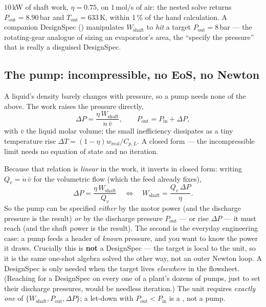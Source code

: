 \documentclass[11pt,a4paper]{article}
\begin{document}
\begin{example}
$10$\,kW of shaft work, $\eta=0.75$, on $1$\,mol/s of air: the nested
solve returns $P_{\text{out}}=8.90$\,bar and $T_{\text{out}}=633$\,K,
within 1\,\% of the hand calculation.  A companion DesignSpec
() manipulates $W_{\text{shaft}}$
to \emph{hit} a target $P_{\text{out}}=8$\,bar --- the rotating-gear
analogue of sizing an evaporator's area, the ``specify the pressure''
that is really a disguised DesignSpec.
\end{example}

\subsection{The pump: incompressible, no EoS, no Newton}

A liquid's density barely changes with pressure, so a pump needs none
of the above.  The work raises the pressure directly,
\begin{equation}
   \Delta P = \frac{\eta\,W_{\text{shaft}}}{\dot n\,\bar v}, \qquad
   P_{\text{out}} = P_{\text{in}} + \Delta P,
\end{equation}
with $\bar v$ the liquid molar volume; the small inefficiency dissipates
as a tiny temperature rise $\Delta T = (1-\eta)w_{\text{real}}/C_{p,L}$.
A closed form --- the incompressible limit needs no equation of state
and no iteration.

\begin{intuition}
Because that relation is \emph{linear} in the work, it inverts in closed
form: writing $Q_v=\dot n\,\bar v$ for the volumetric flow (which the feed
already fixes),
\[
   \Delta P = \frac{\eta\,W_{\text{shaft}}}{Q_v}
   \quad\Longleftrightarrow\quad
   W_{\text{shaft}} = \frac{Q_v\,\Delta P}{\eta}.
\]
So the pump can be specified \emph{either} by the motor power (and the
discharge pressure is the result) \emph{or} by the discharge pressure
$P_{\text{out}}$ --- or rise $\Delta P$ --- it must reach (and the shaft
power is the result).  The second is the everyday engineering case: a
pump feeds a header of \emph{known} pressure, and you want to know the
power it draws.  Crucially this is \textbf{not} a DesignSpec --- the
target is local to the unit, so it is the same one-shot algebra solved
the other way, not an outer Newton loop.  A DesignSpec is only needed
when the target lives \emph{elsewhere} in the flowsheet.  (Reaching for a
DesignSpec on every one of a plant's dozens of pumps, just to set their
discharge pressures, would be needless iteration.)  The unit requires
\emph{exactly one} of $\{W_{\text{shaft}},P_{\text{out}},\Delta P\}$;
a let-down with $P_{\text{out}}<P_{\text{in}}$ is a , not a
pump.
\end{intuition}
\end{document}
